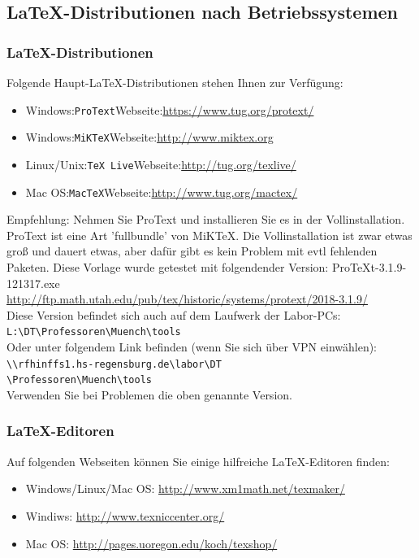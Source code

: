 \documentclass[conference]{IEEEtran}
\begin{document}
\subsection{\LaTeX-Distributionen nach Betriebssystemen}

\subsubsection{\LaTeX-Distributionen}
Folgende Haupt-\LaTeX-Distributionen stehen Ihnen zur Verfügung:
\begin{itemize}
  \item Windows:\quad \texttt{ProText}\quad Webseite:\quad\url{https://www.tug.org/protext/}    
  \item Windows:\quad \texttt{MiKTeX}\quad Webseite:\quad\url{http://www.miktex.org}
  \item Linux/Unix:\quad \texttt{TeX Live}\quad Webseite:\quad\url{http://tug.org/texlive/}
  \item Mac OS:\quad \texttt{MacTeX}\quad Webseite:\quad\url{http://www.tug.org/mactex/}
\end{itemize}
Empfehlung: Nehmen Sie ProText und installieren Sie es in der Vollinstallation. ProText ist eine Art 'fullbundle' von MiKTeX. Die Vollinstallation ist zwar etwas groß und dauert etwas, aber dafür gibt es kein Problem mit evtl fehlenden Paketen.
Diese Vorlage wurde getestet mit folgendender Version:
ProTeXt-3.1.9-121317.exe \\ 
\url{http://ftp.math.utah.edu/pub/tex/historic/systems/protext/2018-3.1.9/} \\
Diese Version befindet sich auch auf dem Laufwerk der Labor-PCs:\\
\verb|L:\DT\Professoren\Muench\tools| \\  
Oder unter folgendem Link befinden (wenn Sie sich über VPN einwählen): \\
\verb|\\rfhinffs1.hs-regensburg.de\labor\DT|\\ \verb|\Professoren\Muench\tools|\\
Verwenden Sie bei Problemen die oben genannte Version.

\subsubsection{\LaTeX-Editoren}
Auf folgenden Webseiten können Sie einige hilfreiche \LaTeX-Editoren finden:
\begin{itemize}
  \item Windows/Linux/Mac OS: \url{http://www.xm1math.net/texmaker/}
  \item Windiws: \url{http://www.texniccenter.org/}
  \item Mac OS: \url{http://pages.uoregon.edu/koch/texshop/}
\end{itemize}
\end{document}
